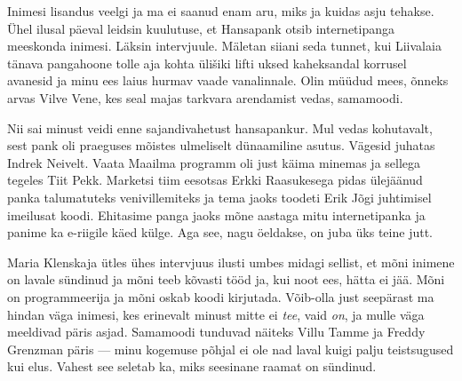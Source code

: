 Inimesi 
lisandus veelgi ja ma ei saanud enam aru, miks ja kuidas asju tehakse. Ühel ilusal päeval
leidsin kuulutuse, et Hansapank 
otsib internetipanga meeskonda inimesi. Läksin intervjuule. Mäletan siiani 
seda tunnet, kui Liivalaia tänava pangahoone tolle aja kohta ülišiki lifti 
uksed kaheksandal korrusel avanesid ja minu ees laius hurmav vaade 
vanalinnale. Olin müüdud mees, õnneks arvas Vilve Vene, 
kes seal majas tarkvara arendamist vedas, samamoodi. 

Nii sai minust veidi enne sajandivahetust 
hansapankur. Mul vedas kohutavalt, sest pank oli praeguses mõistes ulmeliselt 
dünaamiline asutus. Vägesid juhatas Indrek Neivelt. 
Vaata Maailma programm oli just käima minemas ja sellega tegeles Tiit 
Pekk. Marketsi tiim eesotsas Erkki 
Raasukesega pidas ülejäänud panka talumatuteks 
venivillemiteks ja tema jaoks toodeti Erik Jõgi juhtimisel imeilusat 
koodi. Ehitasime panga jaoks mõne aastaga mitu internetipanka ja panime ka e-riigile käed külge. 
Aga see, nagu öeldakse, on juba üks teine jutt.

Maria Klenskaja ütles ühes intervjuus ilusti umbes midagi sellist, et mõni inimene on lavale sündinud
ja mõni teeb kõvasti tööd ja, kui noot ees, hätta ei jää. Mõni on programmeerija ja 
mõni oskab koodi kirjutada. Võib-olla just 
seepärast ma hindan väga inimesi, kes erinevalt minust mitte ei \emph{tee}, vaid \emph{on}, ja mulle väga meeldivad päris asjad.
Samamoodi tunduvad näiteks Villu Tamme ja Freddy Grenzman päris --- minu kogemuse põhjal ei ole nad laval 
kuigi palju teistsugused kui elus. Vahest see seletab ka, miks 
seesinane raamat on sündinud.